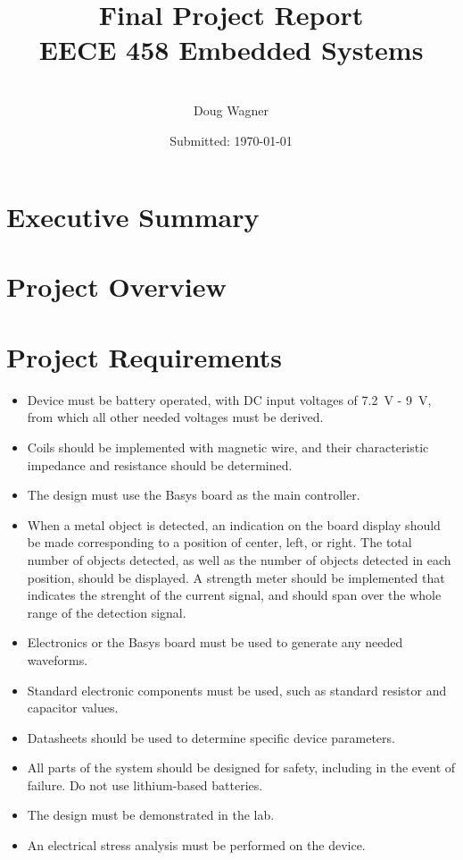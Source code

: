 \documentclass[12pt]{article}
\title{Final Project Report \\ EECE 458 Embedded Systems}
\author{\\ Doug Wagner}
\date{Submitted: \today }
\numberwithin{figure}{section}
\numberwithin{equation}{section}
\begin{document}
\maketitle 
\newpage

\tableofcontents 
\newpage 

\section{Executive Summary}



\section{Project Overview} 


\section{Project Requirements} 
\begin{itemize} 
    \item Device must be battery operated, with DC input voltages of \SI{7.2}{\volt} - \SI{9}{\volt}, from which all other needed voltages must be derived. 
    \item Coils should be implemented with magnetic wire, and their characteristic impedance and resistance should be determined.
    \item The design must use the Basys board as the main controller.
    \item When a metal object is detected, an indication on the board display should be made corresponding to a position of center, left, or right.  The total number of objects detected, as well as the number of objects detected in each position, should be displayed. A strength meter should be implemented that indicates the strenght of the current signal, and should span over the whole range of the detection signal.
    \item Electronics or the Basys board must be used to generate any needed waveforms. 
    \item Standard electronic components must be used, such as standard resistor and capacitor values.
    \item Datasheets should be used to determine specific device parameters. 
    \item All parts of the system should be designed for safety, including in the event of failure.  Do not use lithium-based batteries.
    \item The design must be demonstrated in the lab.
    \item An electrical stress analysis must be performed on the device.
\end{itemize}
\end{document}
